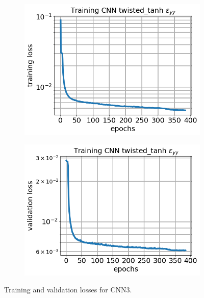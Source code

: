 \documentclass[10pt]{article}
\newcommand{\nhghalfwidth}{0.48\linewidth}
\newcommand{\nhgtotalheight}{4cm}
\begin{document}
\begin{figure}[!h]
  \centering
  \begin{subfigure}[c]{\nhghalfwidth}
    \centering
    \includegraphics[totalheight=\nhgtotalheight]{Figures/Results3/loss.png}
  \end{subfigure}
%  
  \begin{subfigure}[c]{\nhghalfwidth}
    \centering
    \includegraphics[totalheight=\nhgtotalheight]{Figures/Results3/val_loss.png}
  \end{subfigure}
  \caption{\label{fig:cnn3losses} Training and validation losses for CNN3.}
\end{figure}
%
\end{document}
